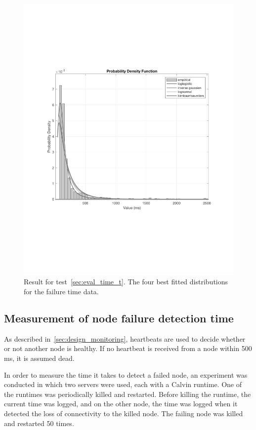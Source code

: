 \documentclass{cslthse-msc}
\begin{document}
\begin{figure}[!hbt]
\centering
\includegraphics[scale=0.5]{images/results/distribution_results.pdf} 
\caption{Result for test~\ref{sec:eval_time_t}. The four best fitted distributions for the failure time data.}\label{fig:distribution_results}
\end{figure} 

\subsection{Measurement of node failure detection time} \label{subsec:eval_node_fail_time}
As described in~\cref{sec:design_monitoring}, heartbeats are used to decide whether or not another node is healthy. If no heartbeat is received from a node within 500 ms, it is assumed dead. 

In order to measure the time it takes to detect a failed node, an experiment was conducted in which two servers were used, each with a Calvin runtime. One of the runtimes was periodically killed and restarted. Before killing the runtime, the current time was logged, and on the other node, the time was logged when it detected the loss of connectivity to the killed node. The failing node was killed and restarted 50 times.
\end{document}
